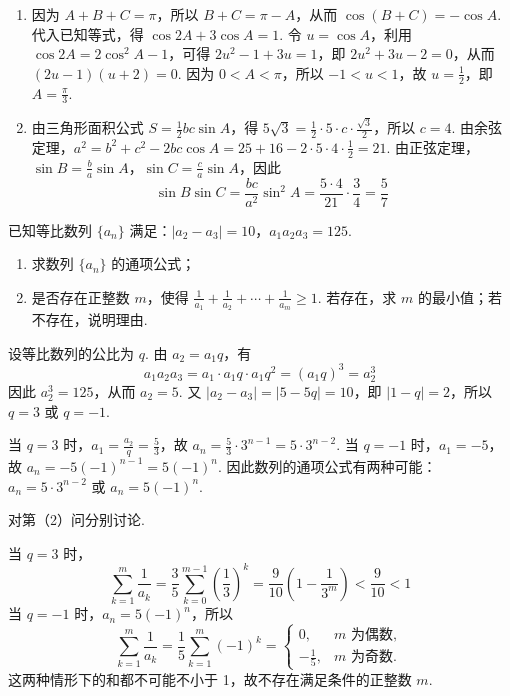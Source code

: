 \begin{solution}
\begin{enumerate}
\item 因为 \(A+B+C=\pi\)，所以 \(B+C=\pi-A\)，从而 \(\cos(B+C)=-\cos A\). 代入已知等式，得 \(\cos 2A+3\cos A=1\).
令 \(u=\cos A\)，利用 \(\cos 2A=2\cos^2A-1\)，可得 \(2u^2-1+3u=1\)，即 \(2u^2+3u-2=0\)，从而 \((2u-1)(u+2)=0\).
因为 \(0<A<\pi\)，所以 \(-1<u<1\)，故 \(u=\frac{1}{2}\)，即 \(A=\frac{\pi}{3}\).

\item 由三角形面积公式 \(S=\frac{1}{2}bc\sin A\)，得 \(5\sqrt{3}=\frac{1}{2}\cdot5\cdot c\cdot\frac{\sqrt{3}}{2}\)，所以 \(c=4\). 由余弦定理，\(a^2=b^2+c^2-2bc\cos A=25+16-2\cdot5\cdot4\cdot\frac{1}{2}=21\). 由正弦定理，\(\sin B=\frac{b}{a}\sin A\)，\(\sin C=\frac{c}{a}\sin A\)，因此
\[
\sin B\sin C
=\frac{bc}{a^2}\sin^2A
=\frac{5\cdot4}{21}\cdot\frac{3}{4}
=\frac{5}{7}
\]
\end{enumerate}
\end{solution}

\begin{problem}
已知等比数列 \(\{a_{n}\}\) 满足：\(\left|a_2 - a_3\right| = 10\)，\(a_1a_2a_3 = 125\).
\begin{enumerate}
\item 求数列 \(\{a_{n}\}\) 的通项公式；
\item 是否存在正整数 \(m\)，使得 \(\frac{1}{a_1} + \frac{1}{a_2} + \cdots + \frac{1}{a_m} \geqslant 1\). 若存在，求 \(m\) 的最小值；若不存在，说明理由.
\end{enumerate}
\end{problem}

\begin{solution}
设等比数列的公比为 \(q\). 由 \(a_2=a_1q\)，有
\[
a_1a_2a_3=a_1\cdot a_1q\cdot a_1q^2=(a_1q)^3=a_2^3
\]
因此 \(a_2^3=125\)，从而 \(a_2=5\). 又 \(|a_2-a_3|=|5-5q|=10\)，即 \(|1-q|=2\)，所以 \(q=3\) 或 \(q=-1\).

当 \(q=3\) 时，\(a_1=\frac{a_2}{q}=\frac{5}{3}\)，故
\(a_n=\frac{5}{3}\cdot3^{n-1}=5\cdot3^{n-2}\).
当 \(q=-1\) 时，\(a_1=-5\)，故
\(a_n=-5(-1)^{n-1}=5(-1)^n\). 因此数列的通项公式有两种可能：\(a_n=5\cdot3^{n-2}\) 或 \(a_n=5(-1)^n\).

对第（2）问分别讨论.

当 \(q=3\) 时，
\[
\sum_{k=1}^{m}\frac{1}{a_k}
=\frac{3}{5}\sum_{k=0}^{m-1}\left(\frac{1}{3}\right)^k
=\frac{9}{10}\left(1-\frac{1}{3^m}\right)<\frac{9}{10}<1
\]
当 \(q=-1\) 时，\(a_n=5(-1)^n\)，所以
\[
\sum_{k=1}^{m}\frac{1}{a_k}
=\frac{1}{5}\sum_{k=1}^{m}(-1)^k
=\begin{cases}
0,&m\text{ 为偶数},\\
-\frac{1}{5},&m\text{ 为奇数}.
\end{cases}
\]
这两种情形下的和都不可能不小于 1，故不存在满足条件的正整数 \(m\).
\end{solution}

